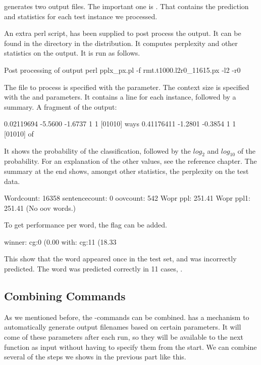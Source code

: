 \documentclass[a4paper,10pt,twoside]{report}
\begin{document}
\Wopr{} generates two output files. The important one is
. That contains the prediction and
statistics for each test instance we processed.

An extra perl script,  has been supplied to post
process the output. It can be found in the  directory in the
\wopr{} distribution. It computes perplexity and other statistics on
the output. It is run as follows.

\begin{bash}{Post processing of \wopr{} output}
perl pplx_px.pl -f rmt.t1000.l2r0_11615.px -l2 -r0
\end{bash}

The file to process is specified with the  parameter. The
context size is specified with the  and 
parameters. It contains a line for each instance, followed by a
summary. A fragment of the output:

\begin{wout}{}
0.02119694  -5.5600  -1.6737  1 1 [01010] ways
0.41176411  -1.2801  -0.3854  1 1 [01010] of
\end{wout}

It shows the probability of the classification, followed by the
$log_2$ and $log_{10}$ of the probability. For an explanation of the
other values, see the reference chapter. The summary at the end shows,
amongst other statistics, the perplexity on the test data.

\begin{wout}{}
Wordcount: 16358 sentencecount: 0 oovcount: 542
Wopr ppl:    251.41 Wopr ppl1:    251.41  (No oov words.)
\end{wout}

To get performance per word, the  flag can be added.

\begin{wout}{}
winner: cg:0 (0.00%
with: cg:11 (18.33%
\end{wout}

This show that the word  appeared once in the test set,
and was incorrectly predicted. The word  was predicted
correctly in \num{11} cases, \etc{}.

\subsection{Combining Commands}

As we mentioned before, the \wopr{}-commands can be combined. \Wopr{}
has a mechanism to automatically generate output filenames based on
certain parameters. It will  come of these parameters after
each run, so they will be available to the next function as input
without having to specify them from the start. We can combine several
of the steps we shows in the previous part like this.
\end{document}
